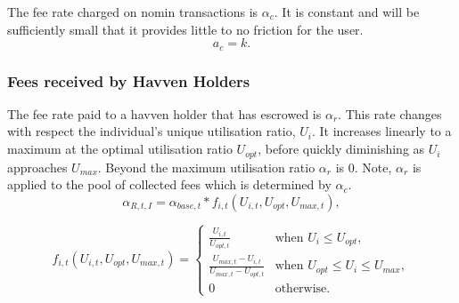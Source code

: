 \noindent The fee rate charged on nomin transactions is $\alpha_c$. It is constant and will be sufficiently small that it provides little to no friction for the user.\\

$$ a_c = k.$$ 

\begin{center}
\end{center}

\newpage
\subsubsection{Fees received by Havven Holders}

\noindent The fee rate paid to a havven holder that has escrowed is $\alpha_r$. This rate changes with respect the individual's unique utilisation ratio, $U_i$. It increases linearly to a maximum at the optimal utilisation ratio $U_{opt}$, before quickly diminishing as $U_i$ approaches $U_{max}$. Beyond the maximum utilisation ratio $\alpha_r$ is 0. Note, $\alpha_r$ is applied to the pool of collected fees which is determined by $\alpha_c$. \\

$$ \alpha_{R,t,I} = \alpha_{base,t} * f_{i,t}(U_{i,t}, U_{opt}, U_{max,t}), $$

\[
f_{i,t}(U_{i,t}, U_{opt}, U_{max,t}) = 
\begin{cases}
 \frac{U_{i,t}}{U_{opt,t}} &\mbox{when } U_i \leq U_{opt}, \\[1em]
 \frac{U_{max,t} - U_{i,t}}{U_{max,t} - U_{opt,t}} &\mbox{when } U_{opt} \leq U_i \leq U_{max}, \\[1em]
 0 &\mbox{otherwise}.
 \end{cases}
\]

\begin{center}
\end{center}

